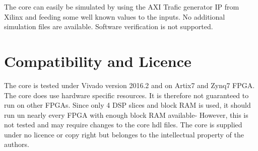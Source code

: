 The core can easily be simulated by using the AXI Trafic generator IP from Xilinx and feeding some well known values to the inputs.
No additional simulation files are available.
Software verification is not supported.

\section{Compatibility and Licence}
The core is tested under Vivado version 2016.2 and on Artix7 and Zynq7 FPGA.
The core does use hardware specific resources.
It is therefore not guaranteed to run on other FPGAs.
Since only 4 DSP slices and block RAM is used, it should run un nearly every FPGA with enough block RAM available-
However, this is not tested and may require changes to the core hdl files.
The core is supplied under no licence or copy right but belonges to the intellectual property of the authors.

